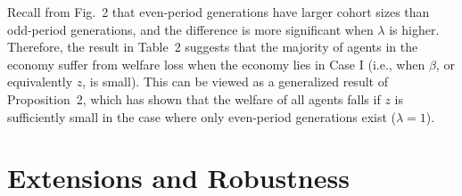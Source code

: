 \documentclass{MBE}%
\begin{document}
{%



Recall from Fig.~2 that even-period generations have larger cohort sizes than odd-period
generations, and the difference is more significant when $\lambda$ is higher. Therefore, the
result in Table~2 suggests that the majority of agents in the economy suffer from welfare loss
when the economy lies in Case I (i.e., when $\beta$, or equivalently $z$, is small). This can be
viewed as a generalized result of Proposition~2, which has shown that the welfare of all agents
falls if $z$ is sufficiently small in the case where only even-period generations exist
($\lambda=1$).


\section{Extensions and Robustness \label{sec:Robustness}}

}
\end{document}
